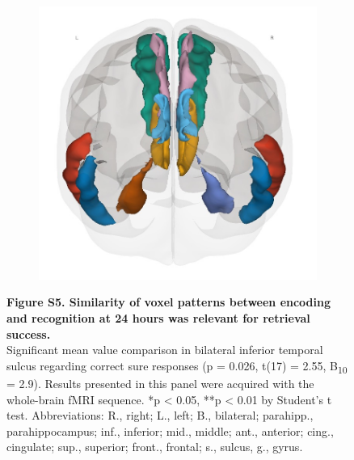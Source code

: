 \begin{figure}[!ht]
\begin{subfigure}[]{0.19\linewidth}
\end{subfigure}
\begin{subfigure}[]{0.19\linewidth}
    \centering
    \includegraphics[width=\linewidth]{paper/src/figures/wb_rois_back.jpg}
\end{subfigure}
     \caption*{\textbf{Figure S5. Similarity of voxel patterns between encoding and recognition at 24 hours was relevant for retrieval success.} \\ \vspace{0.5em}
Significant mean value comparison in bilateral inferior temporal sulcus regarding correct sure responses (p = 0.026, t(17) = 2.55, B\textsubscript{10} = 2.9). Results presented in this panel were acquired with the whole-brain fMRI sequence. *p < 0.05, **p < 0.01 by Student’s t test. Abbreviations: R., right; L., left; B., bilateral; parahipp., parahippocampus; inf., inferior; mid., middle; ant., anterior; cing., cingulate; sup., superior; front., frontal; s., sulcus, g., gyrus.
}
\end{figure}


\newpage


